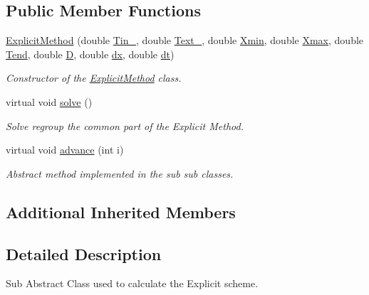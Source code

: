 \subsection*{Public Member Functions}
\begin{DoxyCompactItemize}
\item 
\hyperlink{class_explicit_method_aa88329525eb6c640c7634792c933d3ea}{Explicit\+Method} (double \hyperlink{class_heat_conduction_a2487010bf67582643ff59c0c5167725e}{Tin\+\_}, double \hyperlink{class_heat_conduction_aeb50fb3189fd6545f765ef73c9be7889}{Text\+\_}, double \hyperlink{class_heat_conduction_a6ccf374e13ab91b2403db617c9e7a8f0}{Xmin}, double \hyperlink{class_heat_conduction_a187dd05134300536dd9b5418e2957e9a}{Xmax}, double \hyperlink{class_heat_conduction_ab1d00caf79f4c04b420189eaf7c666e1}{Tend}, double \hyperlink{class_heat_conduction_a197d8aa3aa8619edaa640c243bdfc793}{D}, double \hyperlink{class_heat_conduction_a208bf1f475147b07a1f7d28533d78d9c}{dx}, double \hyperlink{class_heat_conduction_a7a7d5f6631039781c80b8c0c60e540e6}{dt})
\begin{DoxyCompactList}\small\item\em Constructor of the \hyperlink{class_explicit_method}{Explicit\+Method} class. \end{DoxyCompactList}\item 
virtual void \hyperlink{class_explicit_method_a096efa29c4315794c60182e31c54a45e}{solve} ()
\begin{DoxyCompactList}\small\item\em Solve regroup the common part of the Explicit Method. \end{DoxyCompactList}\item 
virtual void \hyperlink{class_explicit_method_afdff9dbaacf767cdfe295103f3de41ef}{advance} (int i)
\begin{DoxyCompactList}\small\item\em Abstract method implemented in the sub sub classes. \end{DoxyCompactList}\end{DoxyCompactItemize}
\subsection*{Additional Inherited Members}


\subsection{Detailed Description}
Sub Abstract Class used to calculate the Explicit scheme. 

